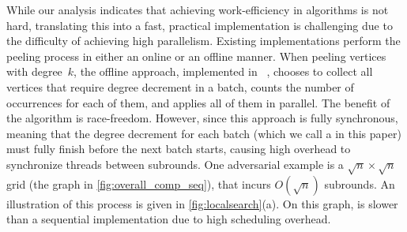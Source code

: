 
 While our analysis indicates that achieving work-efficiency in \kcore{} algorithms is not hard,
translating this into a fast, practical implementation is challenging due to the difficulty of achieving high parallelism.
Existing implementations perform the peeling process in either an online or an offline manner. 
When peeling vertices with degree~$k$, the offline approach, implemented in \Julienne{}~\cite{dhulipala2017}, 
chooses to collect all vertices that require degree decrement in a batch, counts the number of occurrences for each of them,
and applies all of them in parallel. 
The benefit of the algorithm is race-freedom. 
However, since this approach is fully synchronous, meaning that the degree decrement for each batch (which we call a  in this paper) must fully finish before the next batch starts, causing high overhead to synchronize threads between subrounds. 
One adversarial example is a $\sqrt{n}\times \sqrt{n}$ grid (the \GRD{} graph in \cref{fig:overall_comp_seq}), 
that incurs $O(\sqrt{n})$ subrounds.
An illustration of this process is given in \cref{fig:localsearch}(a).
On this graph, \Julienne{} is slower than a sequential implementation due to high scheduling overhead. 

